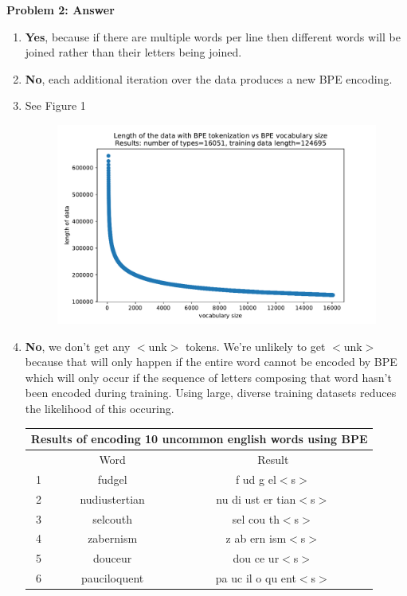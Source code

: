 {\bf Problem 2: Answer}

\begin{enumerate}[label={\arabic*.}]
    \item {\bf Yes}, because if there are multiple words per line then different words will be joined rather than their letters being joined. 
    \item {\bf No}, each additional iteration over the data produces a new BPE encoding. 
    \item See Figure 1 
	\begin{figure}[h!]
	    \centering
	    \includegraphics[width=0.8\linewidth]{../figures/plot.pdf}
	    \caption{}
	\end{figure}
    \item {\bf No}, we don't get any $<$unk$>$ tokens. We're unlikely to get $<$unk$>$ because that will only happen if the entire word cannot be encoded by BPE which will only occur if the sequence of letters composing that word hasn't been encoded during training. Using large, diverse training datasets reduces the likelihood of this occuring. 
	\begin{center}
	\begin{tabular}{ |c|c|c| } 
	    \multicolumn{3}{c}{Results of encoding 10 uncommon english words using BPE} \\	
	    \hline
	    & Word & Result \\
	    \hline
	    1 & fudgel & f ud g el$<$s$>$ \\
	    \hline
	    2 & nudiustertian & nu di ust er tian$<$s$>$ \\
	    \hline
	    3 & selcouth & sel cou th$<$s$>$ \\
	    \hline
	    4 & zabernism & z ab ern ism$<$s$>$ \\
	    \hline
	    5 & douceur & dou ce ur$<$s$>$ \\
	    \hline
	    6 & pauciloquent & pa uc il o qu ent$<$s$>$ \\

\end{tabular}
\end{center}
\end{enumerate}
